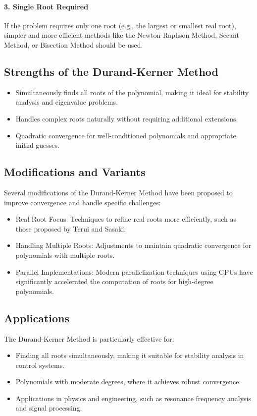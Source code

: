 \documentclass[10pt]{IEEEtran}
\begin{document}
\paragraph{3. Single Root Required}
If the problem requires only one root (e.g., the largest or smallest real root), simpler and more efficient methods like the Newton-Raphson Method, Secant Method, or Bisection Method should be used.

\subsection{Strengths of the Durand-Kerner Method}
\begin{itemize}
    \item Simultaneously finds all roots of the polynomial, making it ideal for stability analysis and eigenvalue problems.
    \item Handles complex roots naturally without requiring additional extensions.
    \item Quadratic convergence for well-conditioned polynomials and appropriate initial guesses.
\end{itemize}

\subsection{Modifications and Variants}
Several modifications of the Durand-Kerner Method have been proposed to improve convergence and handle specific challenges:
\begin{itemize}
    \item Real Root Focus: Techniques to refine real roots more efficiently, such as those proposed by Terui and Sasaki\cite{teruiDurandKernerMethodReal2002}.
    \item Handling Multiple Roots: Adjustments to maintain quadratic convergence for polynomials with multiple roots\cite{fraigniaudDurandKernerPolynomialsRootsfinding1991}.
    \item Parallel Implementations: Modern parallelization techniques using GPUs have significantly accelerated the computation of roots for high-degree polynomials\cite{ghidoucheParallelImplementationDurandKerner2014}.
\end{itemize}

\subsection{Applications}
The Durand-Kerner Method is particularly effective for:
\begin{itemize}
    \item Finding all roots simultaneously, making it suitable for stability analysis in control systems.
    \item Polynomials with moderate degrees, where it achieves robust convergence.
    \item Applications in physics and engineering, such as resonance frequency analysis and signal processing.
\end{itemize}


\nocite{*}


\end{document}
